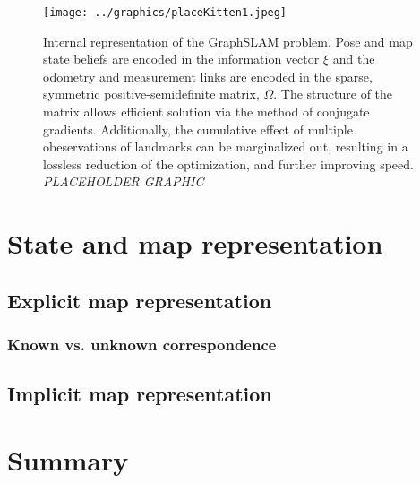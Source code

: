 \begin{figure}[htbp]
   \centering
   \texttt{[image: ../graphics/placeKitten1.jpeg]} %
   \caption{Internal representation of the GraphSLAM problem. Pose and map state beliefs are encoded in the information vector $\xi$ and the odometry and measurement links are encoded in the sparse, symmetric positive-semidefinite matrix, $\Omega$. The structure of the matrix allows efficient solution via the method of conjugate gradients. Additionally, the cumulative effect of multiple obeservations of landmarks can be marginalized out, resulting in a lossless reduction of the optimization, and further improving speed. \emph{PLACEHOLDER GRAPHIC}}
   \label{fig:GraphSLAM}
\end{figure}


\section{State and map representation}

\subsection{Explicit map representation}

\subsubsection{Known vs. unknown correspondence}

\subsection{Implicit map representation}

\section{Summary}